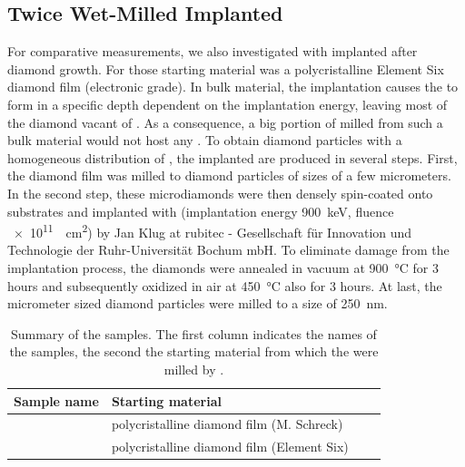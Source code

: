 	\subsection{Twice Wet-Milled Implanted \Nds}\label{subsec::2_milled_nds}
	For comparative measurements, we also investigated \nds with \sivs implanted after diamond growth. 
	For those \nds starting material was a polycristalline Element Six diamond film (electronic grade).
	In bulk material, the implantation causes the \sivs to form in a specific depth dependent on the implantation energy, leaving most of the diamond vacant of \sivs.
	As a consequence, a big portion of  \nds milled from such a bulk material would not host any \sivs.
	To obtain diamond particles with a homogeneous distribution of \sivs, the implanted \nds are produced in several steps. 
	First, the diamond film was milled to diamond particles of sizes of a few micrometers.
	In the second step, these microdiamonds were then densely spin-coated onto \ir substrates and implanted with (implantation energy \SI{900}{keV}, fluence \SI{e11}{\per\centi\meter\squared}) by Jan Klug at rubitec - Gesellschaft für Innovation und Technologie der Ruhr-Universität Bochum mbH.
	To eliminate damage from the implantation process, the diamonds were annealed in vacuum at \SI{900}{\degreeCelsius} for 3 hours and subsequently oxidized in air at \SI{450}{\degreeCelsius} also for 3 hours.
	At last, the micrometer sized diamond particles were milled to a size of \SI{250}{\nano\meter}.



	\begin{table}[tp] 
		\centering 
		\caption{Summary of the \BASD samples. The first column indicates the names of the samples, the second the starting material from which the \nds were milled by \basd.} \label{tab::basd_samplenames} 
			\begin{tabular}{llll} 
			\toprule
			Sample name & Starting material \\ 
			\midrule
			\basds & polycristalline diamond film (M. Schreck) \\ \hline 
			\basdes & polycristalline diamond film (Element Six) \\ 
			\bottomrule
			\end{tabular} 
	\end{table}



